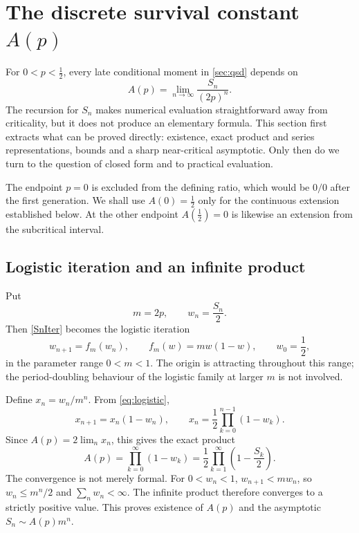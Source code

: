 \section{The discrete survival constant \texorpdfstring{\(A(p)\)}{A(p)}}
\label{sec:Ap}

For \(0<p<\tfrac12\), every late conditional moment in
\cref{sec:qsd} depends on
\[
  A(p)=\lim_{n\to\infty}\frac{S_n}{(2p)^n}.
\]
The recursion for \(S_n\) makes numerical evaluation straightforward away from
criticality, but it does not produce an elementary formula.  This section first
extracts what can be proved directly: existence, exact product and series
representations, bounds and a sharp near-critical asymptotic.  Only then do we
turn to the question of closed form and to practical evaluation.

The endpoint \(p=0\) is excluded from the defining ratio, which would be \(0/0\)
after the first generation.  We shall use \(A(0)=\tfrac12\) only for the continuous
extension established below.  At the other endpoint \(A(\tfrac12)=0\) is likewise
an extension from the subcritical interval.

\subsection{Logistic iteration and an infinite product}
\label{sec:product}

Put
\begin{equation}
  m=2p,
  \qquad
  w_n=\frac{S_n}{2}.
  \label{eq:logistic-change}
\end{equation}
Then \eqref{SnIter} becomes the logistic iteration
\begin{equation}
  w_{n+1}=f_m(w_n),
  \qquad
  f_m(w)=mw(1-w),
  \qquad
  w_0=\frac12,
  \label{eq:logistic}
\end{equation}
in the parameter range \(0<m<1\).  The origin is attracting throughout this
range; the period-doubling behaviour of the logistic family at larger \(m\) is not
involved.

Define \(x_n=w_n/m^n\).  From \eqref{eq:logistic},
\begin{equation}
  x_{n+1}=x_n(1-w_n),
  \qquad
  x_n=\frac12\prod_{k=0}^{n-1}(1-w_k).
  \label{eq:xn-product}
\end{equation}
Since \(A(p)=2\lim_nx_n\), this gives the exact product
\begin{equation}
  A(p)=\prod_{k=0}^{\infty}(1-w_k)
  =\frac12\prod_{k=1}^{\infty}
  \left(1-\frac{S_k}{2}\right).
  \label{eq:prodFormula}
\end{equation}
The convergence is not merely formal.  For \(0<w_n<1\),
\(w_{n+1}<mw_n\), so \(w_n\leq m^n/2\) and
\(\sum_nw_n<\infty\).  The infinite product therefore converges to a strictly
positive value.  This proves existence of \(A(p)\) and the asymptotic
\(S_n\sim A(p)m^n\).

